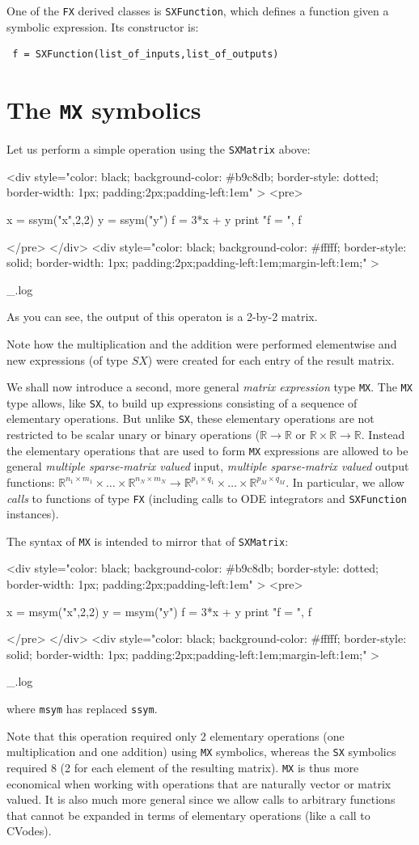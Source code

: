 \documentclass[a4paper,12pt]{book}
\newcounter{pytexcount}
\newcounter{pytexsubcount}
\newcommand{\pytexStart}[1]{
  \addtocounter{pytexcount}{1}%
  \setcounter{pytexsubcount}{0}%
}
\renewenvironment{pytex}
{\addtocounter{pytexsubcount}{1}%
\begin{rawhtml}
<div style="color: black; background-color: \#b9c8db;  border-style: dotted; border-width: 1px; padding:2px;padding-left:1em" >
<pre>
\end{rawhtml}
}%
{\begin{rawhtml}
</pre>
</div>
<div style="color: black; background-color: \#fffff;  border-style: solid; border-width: 1px; padding:2px;padding-left:1em;margin-left:1em;" >\end{rawhtml}
_\arabic{pytexsubcount}.log}%
\begin{rawhtml}
</div>
\end{rawhtml}
}
\begin{document}
{One of the \texttt{FX} derived classes is \texttt{SXFunction}, which defines a function given a symbolic expression. Its constructor is:
\begin{verbatim}
 f = SXFunction(list_of_inputs,list_of_outputs)
\end{verbatim}

\section{The \texttt{MX} symbolics}

\pytexStart{main}

Let us perform a simple operation using the \texttt{SXMatrix} above:
\begin{pytex}
x = ssym("x",2,2)
y = ssym("y")
f = 3*x + y
print "f = ", f
\end{pytex}

As you can see, the output of this operaton is a 2-by-2 matrix.

Note how the multiplication and the addition were performed elementwise and new expressions (of type $SX$) were created for each entry of the result matrix.

We shall now introduce a second, more general \emph{matrix expression} type \texttt{MX}. The \texttt{MX} type allows, like \texttt{SX}, to build up expressions consisting of a sequence of elementary operations. But unlike \texttt{SX}, these elementary operations are not restricted to be scalar unary or binary operations ($\mathbb{R} \rightarrow \mathbb{R}$ or $\mathbb{R} \times \mathbb{R} \rightarrow \mathbb{R}$. Instead the elementary operations that are used to form \texttt{MX} expressions are allowed to be general \emph{multiple sparse-matrix valued} input, \emph{multiple sparse-matrix valued} output functions: $\mathbb{R}^{n_1 \times m_1} \times \ldots \times \mathbb{R}^{n_N \times m_N} \rightarrow \mathbb{R}^{p_1 \times q_1} \times \ldots \times \mathbb{R}^{p_M \times q_M}$. In particular, we allow \emph{calls} to functions of type \texttt{FX} (including calls to ODE integrators and \texttt{SXFunction} instances).

The syntax of \texttt{MX} is intended to mirror that of \texttt{SXMatrix}:
\begin{pytex}
x = msym("x",2,2)
y = msym("y")
f = 3*x + y
print "f = ", f
\end{pytex}

where \texttt{msym} has replaced \texttt{ssym}.

Note that this operation required only 2 elementary operations (one multiplication and one addition) using \texttt{MX} symbolics, whereas the \texttt{SX} symbolics required 8 (2 for each element of the resulting matrix). \texttt{MX} is thus more economical when working with operations that are naturally vector or matrix valued. It is also much more general since we allow calls to arbitrary functions that cannot be expanded in terms of elementary operations (like a call to CVodes). %

}
\end{document}
